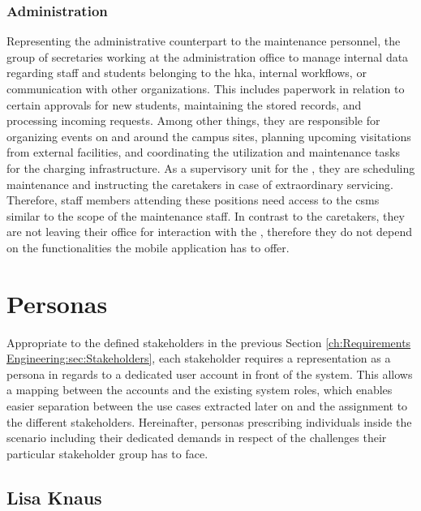 \subsubsection{Administration}
\label{ch:Requirements Engineering:sec:Stakeholders:ssec:Staff:sssec:Administration}

Representing the administrative counterpart to the maintenance personnel, the group of secretaries working at the administration office to manage internal data regarding staff and students belonging to the \acrshort{hka}, internal workflows, or communication with other organizations. 
This includes paperwork in relation to certain approvals for new students, maintaining the stored records, and processing incoming requests. Among other things, they are responsible for organizing events on and around the campus sites, planning upcoming visitations from external facilities, and coordinating the utilization and maintenance tasks for the charging infrastructure.
As a supervisory unit for the , they are scheduling maintenance and instructing the caretakers in case of extraordinary servicing.  
Therefore, staff members attending these positions need access to the \acrshort{csms} similar to the scope of the maintenance staff. In contrast to the caretakers, they are not leaving their office for interaction with the , therefore they do not depend on the functionalities the mobile application has to offer.

\section{Personas}
\label{ch:Requirements Engineering:sec:Personas}

Appropriate to the defined stakeholders in the previous Section \ref{ch:Requirements Engineering:sec:Stakeholders}, each stakeholder requires a representation as a persona in regards to a dedicated user account in front of the system.
This allows a mapping between the accounts and the existing system roles, which enables easier separation between the use cases extracted later on and the assignment to the different stakeholders. 
Hereinafter, personas prescribing individuals inside the scenario including their dedicated demands in respect of the challenges their particular stakeholder group has to face. 

\subsection{Lisa Knaus}
\label{ch:Requirements Engineering:sec:Personas:ssec:Lisa Knaus}

